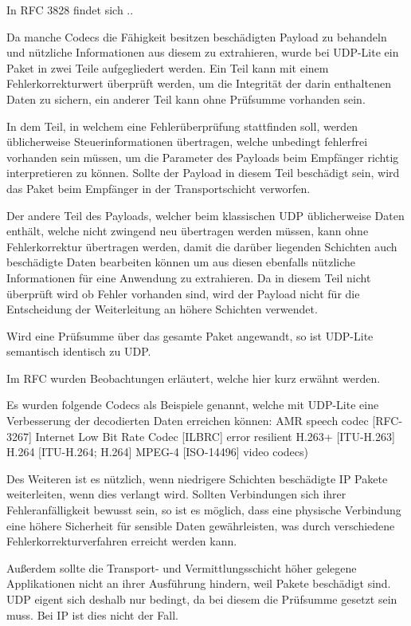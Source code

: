 \documentclass{template}
\begin{document}

In RFC 3828 findet sich ..

Da manche Codecs die Fähigkeit besitzen 
beschädigten Payload zu behandeln und nützliche Informationen
aus diesem zu extrahieren, wurde bei UDP-Lite ein Paket in
zwei Teile aufgegliedert werden. Ein Teil kann mit einem Fehlerkorrekturwert
überprüft werden, um die Integrität der darin enthaltenen Daten zu sichern,
ein anderer Teil kann ohne Prüfsumme vorhanden sein.

In dem Teil, in welchem
eine Fehlerüberprüfung stattfinden soll, werden üblicherweise Steuerinformationen
übertragen, welche unbedingt fehlerfrei vorhanden sein müssen, 
um die Parameter des Payloads beim Empfänger richtig interpretieren zu können.
Sollte der Payload in diesem Teil beschädigt sein, wird das Paket beim Empfänger in der
Transportschicht verworfen.

Der andere Teil des Payloads, welcher beim klassischen UDP üblicherweise Daten enthält,
welche nicht zwingend neu übertragen werden müssen, kann ohne Fehlerkorrektur übertragen werden,
damit die darüber liegenden Schichten auch beschädigte Daten bearbeiten können
um aus diesen ebenfalls nützliche Informationen für eine Anwendung zu extrahieren.
Da in diesem Teil nicht überprüft wird ob Fehler vorhanden sind,
wird der Payload nicht für die Entscheidung der Weiterleitung an höhere Schichten verwendet.

Wird eine Prüfsumme über das gesamte Paket angewandt, so ist UDP-Lite semantisch identisch
zu UDP.

Im RFC wurden Beobachtungen erläutert, welche hier kurz erwähnt werden.

Es wurden folgende Codecs als Beispiele genannt, welche mit UDP-Lite
eine Verbesserung der decodierten Daten erreichen können:
AMR speech codec [RFC-3267]
Internet Low Bit Rate Codec [ILBRC]
error resilient H.263+ [ITU-H.263]
H.264 [ITU-H.264; H.264]
MPEG-4 [ISO-14496] video codecs)

Des Weiteren ist es nützlich, wenn niedrigere Schichten beschädigte IP Pakete
weiterleiten, wenn dies verlangt wird. Sollten Verbindungen sich ihrer
Fehleranfälligkeit bewusst sein, so ist es möglich, dass eine physische Verbindung
eine höhere Sicherheit für sensible Daten gewährleisten, was durch verschiedene
Fehlerkorrekturverfahren erreicht werden kann.

Außerdem sollte die Transport- und Vermittlungsschicht höher gelegene
Applikationen nicht an ihrer Ausführung hindern, weil Pakete beschädigt sind.
UDP eigent sich deshalb nur bedingt, da bei diesem die Prüfsumme gesetzt
sein muss. Bei IP ist dies nicht der Fall.
\end{document}
